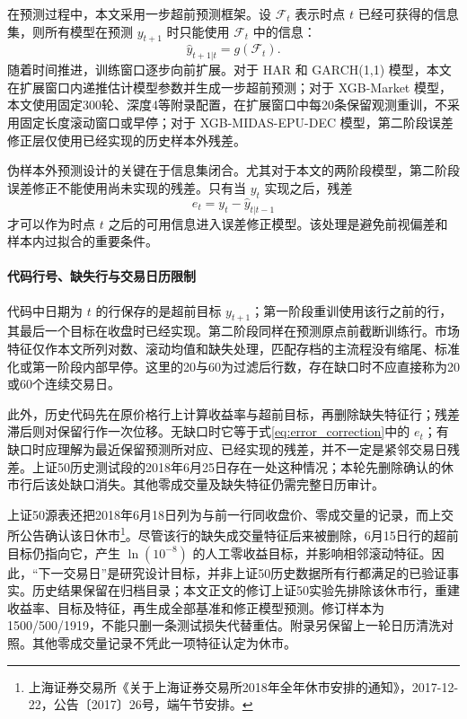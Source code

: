 在预测过程中，本文采用一步超前预测框架。设 \(\mathcal{F}_t\) 表示时点 \(t\) 已经可获得的信息集，则所有模型在预测 \(y_{t+1}\) 时只能使用 \(\mathcal{F}_t\) 中的信息：
\begin{equation}
	\hat{y}_{t+1|t}
	=
	g(\mathcal{F}_t).
\end{equation}
随着时间推进，训练窗口逐步向前扩展。对于 HAR 和 GARCH(1,1) 模型，本文在扩展窗口内递推估计模型参数并生成一步超前预测；对于 XGB-Market 模型，本文使用固定300轮、深度4等附录配置，在扩展窗口中每20条保留观测重训，不采用固定长度滚动窗口或早停；对于 XGB-MIDAS-EPU-DEC 模型，第二阶段误差修正层仅使用已经实现的历史样本外残差。

伪样本外预测设计的关键在于信息集闭合。尤其对于本文的两阶段模型，第二阶段误差修正不能使用尚未实现的残差。只有当 \(y_t\) 实现之后，残差
\begin{equation}
	e_t=y_t-\hat{y}_{t|t-1}
\end{equation}
才可以作为时点 \(t\) 之后的可用信息进入误差修正模型。该处理是避免前视偏差和样本内过拟合的重要条件。

\paragraph{代码行号、缺失行与交易日历限制}
代码中日期为 $t$ 的行保存的是超前目标 $y_{t+1}$；第一阶段重训使用该行之前的行，其最后一个目标在收盘时已经实现。第二阶段同样在预测原点前截断训练行。市场特征仅作本文所列对数、滚动均值和缺失处理，匹配存档的主流程没有缩尾、标准化或第一阶段内部早停。这里的20与60为过滤后行数，存在缺口时不应直接称为20或60个连续交易日。

此外，历史代码先在原价格行上计算收益率与超前目标，再删除缺失特征行；残差滞后则对保留行作一次位移。无缺口时它等于式\eqref{eq:error_correction}中的 $e_t$；有缺口时应理解为最近保留预测所对应、已经实现的残差，并不一定是紧邻交易日残差。上证50历史测试段的2018年6月25日存在一处这种情况；本轮先删除确认的休市行后该处缺口消失。其他零成交量及缺失特征仍需完整日历审计。

上证50源表还把2018年6月18日列为与前一行同收盘价、零成交量的记录，而上交所公告确认该日休市\footnote{上海证券交易所《关于上海证券交易所2018年全年休市安排的通知》，2017-12-22，公告〔2017〕26号，端午节安排。}。尽管该行的缺失成交量特征后来被删除，6月15日行的超前目标仍指向它，产生 $\ln(10^{-8})$ 的人工零收益目标，并影响相邻滚动特征。因此，“下一交易日”是研究设计目标，并非上证50历史数据所有行都满足的已验证事实。历史结果保留在归档目录；本文正文的修订上证50实验先排除该休市行，重建收益率、目标及特征，再生成全部基准和修正模型预测。修订样本为1500/500/1919，不能只删一条测试损失代替重估。附录另保留上一轮日历清洗对照。其他零成交量记录不凭此一项特征认定为休市。

